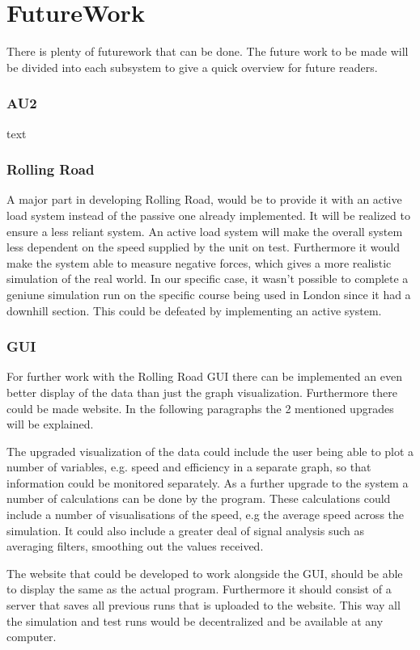 \chapter{FutureWork}
There is plenty of futurework that can be done. The future work to be made will be divided into each subsystem to give a quick overview for future readers. 

\subsection{AU2}
text

\subsection{Rolling Road}
A major part in developing Rolling Road, would be to provide it with an active load system instead of the passive one already implemented. It will be realized to ensure a less reliant system. An active load system will make the overall system less dependent on the speed supplied by the unit on test. Furthermore it would make the system able to measure negative forces, which gives a more realistic simulation of the real world. In our specific case, it wasn't possible to complete a  geniune simulation run on the specific course being used in London since it had a downhill section. This could be defeated by implementing an active system. 

\subsection{GUI}
For further work with the Rolling Road GUI there can be implemented an even better display of the data than just the graph visualization. Furthermore there could be made website. In the following paragraphs the 2 mentioned upgrades will be explained. 

The upgraded visualization of the data could include the user being able to plot a number of variables, e.g. speed and efficiency in a separate graph, so that information could be monitored separately. As a further upgrade to the system a number of calculations can be done by the program. These calculations could include a number of visualisations of the speed, e.g the average speed across the simulation. It could also include a greater deal of signal analysis such as averaging filters, smoothing out the values received. 

The website that could be developed to work alongside the GUI, should be able to display the same as the actual program. Furthermore it should consist of a server that saves all previous runs that is uploaded to the website. This way all the simulation and test runs would be decentralized and be available at any computer.  
